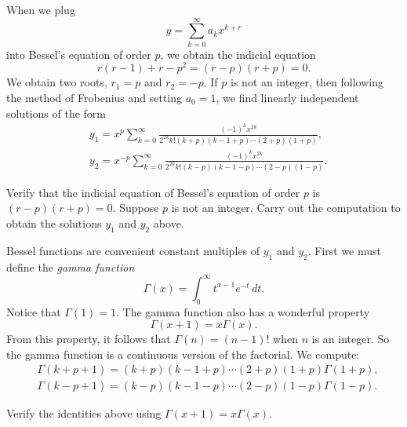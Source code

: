 When we plug
\begin{equation*}
y = \sum_{k=0}^\infty a_k x^{k+r}
\end{equation*}
into Bessel's equation of order $p$, we obtain the indicial equation
\begin{equation*}
r(r-1)+r-p^2 = (r-p)(r+p) = 0 .
\end{equation*}
We obtain two roots, $r_1 = p$ and $r_2 = -p$.
If $p$ is not an integer, then following the method of Frobenius and
setting $a_0 = 1$, we find
linearly independent solutions of the form
\begin{align*}
& y_1 = x^p \sum_{k=0}^\infty
\frac{{(-1)}^k x^{2k}}{2^{2k} k! (k+p)(k-1+p)\cdots (2+p)(1+p)} ,
\\
& y_2 = x^{-p} \sum_{k=0}^\infty
\frac{{(-1)}^k x^{2k}}{2^{2k} k! (k-p)(k-1-p)\cdots (2-p)(1-p)} .
\end{align*}

\begin{exercise}
\leavevmode
\begin{tasks}
\task
Verify that the indicial equation of Bessel's equation of order $p$ is
$(r-p)(r+p)=0$.
\task
Suppose $p$ is not an integer.  Carry out the computation
to obtain the solutions $y_1$ and $y_2$ above.
\end{tasks}
\end{exercise}

Bessel functions are convenient constant multiples of $y_1$ and $y_2$.
First we must define the \emph{gamma function}
\begin{equation*}
\Gamma(x) = \int_0^\infty t^{x-1} e^{-t} \, dt .
\end{equation*}
Notice that $\Gamma(1) = 1$.
The gamma function also has a wonderful property
\begin{equation*}
\Gamma(x+1) = x \Gamma(x) .
\end{equation*}
From this property, it follows that $\Gamma(n) = (n-1)!$ when $n$ is an
integer.  So the gamma function is a continuous version of the factorial.  We
compute:
\begin{align*}
& \Gamma(k+p+1)=(k+p)(k-1+p)\cdots (2+p)(1+p) \Gamma(1+p) ,
\\
& \Gamma(k-p+1)=(k-p)(k-1-p)\cdots (2-p)(1-p) \Gamma(1-p) .
\end{align*}

\begin{exercise}
Verify the identities above using 
$\Gamma(x+1) = x \Gamma(x)$.
\end{exercise}

